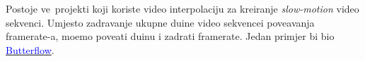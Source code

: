 Postoje ve\cj\ projekti koji koriste video interpolaciju za kreiranje \textit{slow-motion} video sekvenci. Umjesto zadr\zh avanje ukupne du\zh ine video sekvencei pove\cj avanja framerate-a, mo\zh emo pove\cj ati du\zh inu i zadr\zh ati framerate.
Jedan primjer bi bio \href{https://github.com/dthpham/butterflow}{\textcolor{blue}{Butterflow}}.